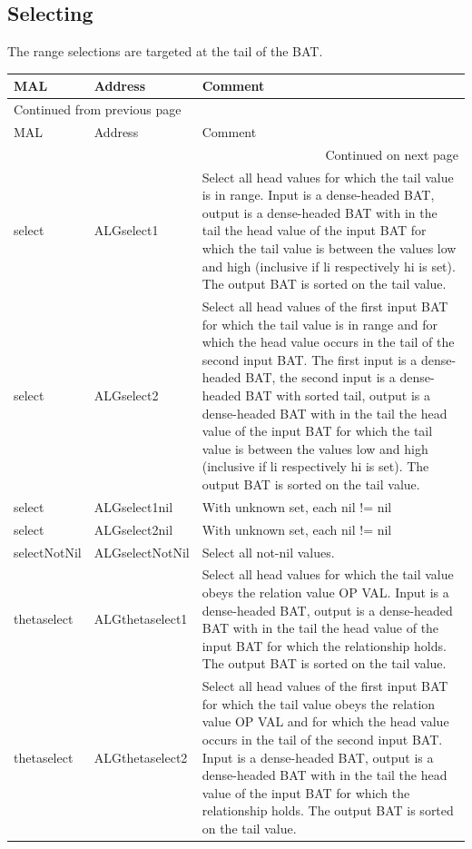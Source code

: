 \documentclass[11pt]{article}
\begin{document}
\subsection{Selecting}
\label{sec:org854b937}
The range selections are targeted at the tail of the BAT.
\begin{longtable}{|l|l|p{10cm}|}
\hline
MAL & Address & Comment\\
\hline
\endfirsthead
\multicolumn{3}{l}{Continued from previous page} \\
\hline

MAL & Address & Comment \\

\hline
\endhead
\hline\multicolumn{3}{r}{Continued on next page} \\
\endfoot
\endlastfoot
\hline
select & ALGselect1 & Select all head values for which the tail value is in range.	Input is a dense-headed BAT, output is a dense-headed BAT with in	the tail the head value of the input BAT for which the tail value	is between the values low and high (inclusive if li respectively	hi is set).  The output BAT is sorted on the tail value.\\
\hline
select & ALGselect2 & Select all head values of the first input BAT for which the tail value	is in range and for which the head value occurs in the tail of the	second input BAT.	The first input is a dense-headed BAT, the second input is a	dense-headed BAT with sorted tail, output is a dense-headed BAT	with in the tail the head value of the input BAT for which the	tail value is between the values low and high (inclusive if li	respectively hi is set).  The output BAT is sorted on the tail	value.\\
\hline
select & ALGselect1nil & With unknown set, each nil != nil\\
\hline
select & ALGselect2nil & With unknown set, each nil != nil\\
\hline
selectNotNil & ALGselectNotNil & Select all not-nil values.\\
\hline
thetaselect & ALGthetaselect1 & Select all head values for which the tail value obeys the relation value OP VAL.	Input is a dense-headed BAT, output is a dense-headed BAT with in	the tail the head value of the input BAT for which the relationship holds.  The output BAT is sorted on the tail value.\\
\hline
thetaselect & ALGthetaselect2 & Select all head values of the first input BAT for which the tail value	obeys the relation value OP VAL and for which the head value occurs in	the tail of the second input BAT.	Input is a dense-headed BAT, output is a dense-headed BAT with in	the tail the head value of the input BAT for which the relationship holds.  The output BAT is sorted on the tail value.\\
\hline
\end{longtable}
\end{document}

